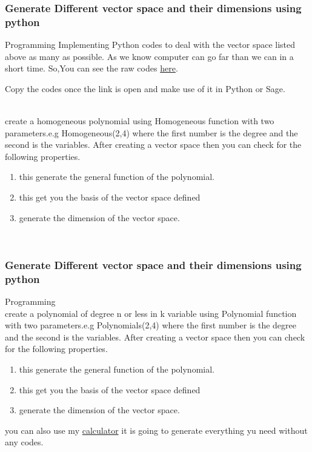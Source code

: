\documentclass{beamer}
\begin{document}
\begin{frame}
\frametitle{Generate Different vector space and their dimensions using python}

\begin{block}{Programming} 
Implementing Python codes to deal with the vector space listed above as many as possible. As we know computer can go far than we can in a short time. So,You can see the raw codes 
\href{https://raw.githubusercontent.com/maxwizardth/Algebra/main/new.py}{here}.

Copy the codes once the link is open and make use of it in \alert{Python} or \alert{Sage}.

\\
create a homogeneous polynomial using Homogeneous function with two parameters.e.g 
\alert{ Homogeneous(2,4)} where the first number is the degree and the second is the variables.
After creating a vector space then you can check for the following properties.
\begin{enumerate}
    \item {} this generate the general function of the polynomial.
    \item {} this get you the basis of the vector space defined
    \item {} generate the dimension of the vector space.
\end{enumerate}
\\
\end{block}
\end{frame}
\begin{frame}
\frametitle{Generate Different vector space and their dimensions using python}

\begin{block}{Programming} 
\\
create a polynomial of degree n or less in k variable using Polynomial function with two parameters.e.g 
\alert{Polynomials(2,4)} where the first number is the degree and the second is the variables.
After creating a vector space then you can check for the following properties.
\begin{enumerate}
    \item {} this generate the general function of the polynomial.
    \item {} this get you the basis of the vector space defined
    \item {} generate the dimension of the vector space.
\end{enumerate}
you can also use my
\href{https://maxwizardth.github.io/youngScientist/Pages/chisquare/Space.html}{calculator}
it is going to generate everything yu need without any codes.
\end{block}
\end{frame}
\end{document}
